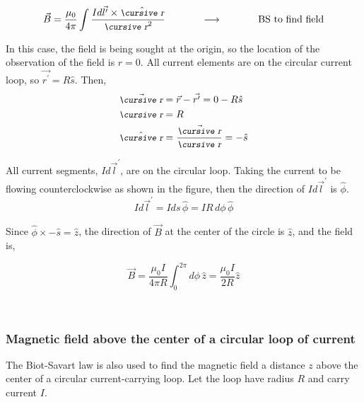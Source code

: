 \documentclass[12pt]{article}
\begin{document}
\begin{flushleft}
\vspace{-.2in}
\begin{equation*}
\vec{B}  = \frac{ \mu_{0} }{4\pi} \int \frac{ Id\vec{l^{\prime}} \times  \hat{\text{\small\slshape\cursive r}}}{\text{\small\slshape\cursive r}^{2}}  \hspace{.5in} \longrightarrow \hspace{.5in} \text{BS to find field}
\end{equation*}

In this case, the field is being sought at the origin, so the location of the observation of the field is $r=0$.  All current elements are on the circular current loop, so $\vec{r^{\prime}}=R\hat{s}$.  Then,
\begin{equation*}
\begin{aligned}
& \vec{\text{\small\slshape\cursive r}} = \vec{r}-\vec{r^{\prime}} = 0 - R\hat{s} \\
& \text{\small\slshape\cursive r} = R \\
& \hat{\text{\small\slshape\cursive r}} =\frac{\vec{\text{\small\slshape\cursive r}}}{\text{\small\slshape\cursive r}} = -\hat{s}
\end{aligned}
\end{equation*}

All current segments, $Id\vec{l}^{\prime}$, are on the circular loop.  Taking the current to be flowing counterclockwise as shown in the figure, then the direction of $Id\vec{l}^{\prime}$ is $\hat{\phi}$.
\[
Id\vec{l}^{\prime}=Ids\, \hat{\phi} = I R \, d\phi \, \hat{\phi}
\]

Since $\hat{\phi} \times -\hat{s} = \hat{z}$, the direction of $\vec{B}$ at the center of the circle is $\hat{z}$, and the field is,

\begin{equation*}
\vec{B}  = \frac{ \mu_{0} I}{4\pi R} \int_{0}^{2\pi} d\phi \, \hat{z} = \frac{\mu_{0} I}{2R} \hat{z}
\end{equation*}

\vspace{.2in}
{\color{mygreen} \hrulefill}\\
\vspace{-.1in}
\subsubsection*{\bf Magnetic field above the center of a circular loop of current}

The Biot-Savart law is also used to find the magnetic field a distance $z$ above the center of a circular current-carrying loop.  Let the loop have radius $R$ and carry current $I$.  


\end{flushleft}
\end{document}
